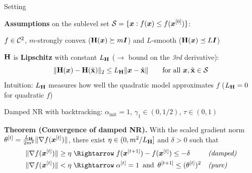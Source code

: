 \documentclass[11pt,compress,t,notes=noshow, xcolor=table]{beamer}
\newcommand{\LH}{L_{\H}}
\begin{document}
\begin{framei}[fs=small]{Setting}
\item \textbf{Assumptions} on the sublevel set $\mathcal{S} = \{\bm{x} : f(\bm{x}) \le f(\bm{x}^{[0]})\}$:
\begin{itemizeM}
\item $f \in \mathcal{C}^{2}$, $m$-strongly convex ($\mathbf{H}(\bm{x}) \succeq m \bm{I}$) and $L$-smooth ($\mathbf{H}(\bm{x}) \preceq L \bm{I}$)
\item $\mathbf{H}$ is \textbf{Lipschitz} with constant $\LH$ ($\rightarrow$ bound on the \textit{3rd} derivative):
$$\|\H(\xv) - \H(\xtil)\|_2 \le \LH \|\xv - \xtil\| \qquad \text{for all } \xv, \xtil \in \S$$
Intuition: $\LH$ measures how well the quadratic model approximates $f$ ($\LH = 0$ for quadratic $f$)
\end{itemizeM}
\item Damped NR with backtracking: $\alpha_{\text{init}} = 1$, $\gamma_1 \in (0, 1/2)$, $\tau \in (0, 1)$
\begin{framed}
\textbf{Theorem \textnormal{(Convergence of damped NR)}.}
With the scaled gradient norm $\theta^{[t]} = \frac{\LH}{2m^2}\|\nabla f(\xv^{[t]})\|$, there exist
$\eta \in (0, m^2/\LH]$ and $\delta > 0$ such that
\begin{align*}
\|\nabla f(\xv^{[t]})\| \ge \eta \; &\Rightarrow \; f(\xv^{[t+1]}) - f(\xv^{[t]}) \le - \delta
&& \textit{(damped)} \\
\|\nabla f(\xv^{[t]})\| < \eta \; &\Rightarrow \; \alpha^{[t]} = 1 \, \text{ and } \,
\theta^{[t+1]} \le (\theta^{[t]})^2 && \textit{(pure)}
\end{align*}
\end{framed}
\end{framei}

\end{document}

